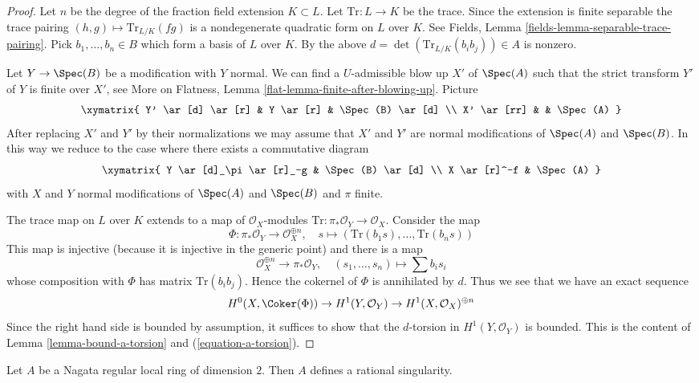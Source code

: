 \begin{proof}
Let $n$ be the degree of the fraction field extension $K \subset L$.
Let $\text{Tr} : L \to K$ be the trace. Since the extension is finite
separable the trace pairing $(h, g) \mapsto \text{Tr}_{L/K}(fg)$
is a nondegenerate quadratic form on $L$ over $K$. See
Fields, Lemma \ref{fields-lemma-separable-trace-pairing}.
Pick $b_1, \ldots, b_n \in B$ which form a basis of $L$ over $K$.
By the above $d = \det(\text{Tr}_{L/K}(b_ib_j)) \in A$ is nonzero.

\medskip\noindent
Let $Y \to \Spec(B)$ be a modification with $Y$ normal. We can find
a $U$-admissible blow up $X'$ of $\Spec(A)$ such that the strict transform
$Y'$ of $Y$ is finite over $X'$, see More on Flatness, Lemma
\ref{flat-lemma-finite-after-blowing-up}. Picture
$$
\xymatrix{
Y' \ar[d] \ar[r] & Y \ar[r] & \Spec(B) \ar[d] \\
X' \ar[rr] & & \Spec(A)
}
$$
After replacing $X'$ and $Y'$ by their normalizations we may assume that
$X'$ and $Y'$ are normal modifications of $\Spec(A)$ and $\Spec(B)$.
In this way we reduce to the case where there exists a commutative diagram
$$
\xymatrix{
Y \ar[d]_\pi \ar[r]_-g & \Spec(B) \ar[d] \\
X \ar[r]^-f & \Spec(A)
}
$$
with $X$ and $Y$ normal modifications of $\Spec(A)$ and $\Spec(B)$ and
$\pi$ finite.

\medskip\noindent
The trace map on $L$ over $K$ extends to a map of $\mathcal{O}_X$-modules
$\text{Tr} : \pi_*\mathcal{O}_Y \to \mathcal{O}_X$. Consider the map
$$
\Phi : \pi_*\mathcal{O}_Y \longrightarrow \mathcal{O}_X^{\oplus n},\quad
s \longmapsto (\text{Tr}(b_1s), \ldots, \text{Tr}(b_ns))
$$
This map is injective (because it is injective in the generic point)
and there is a map
$$
\mathcal{O}_X^{\oplus n} \longrightarrow \pi_*\mathcal{O}_Y,\quad
(s_1, \ldots, s_n) \longmapsto \sum b_i s_i
$$
whose composition with $\Phi$ has matrix $\text{Tr}(b_ib_j)$.
Hence the cokernel of $\Phi$ is annihilated by $d$. Thus we see that
we have an exact sequence
$$
H^0(X, \Coker(\Phi)) \to H^1(Y, \mathcal{O}_Y) \to
H^1(X, \mathcal{O}_X)^{\oplus n}
$$
Since the right hand side is bounded by assumption, it suffices to show
that the $d$-torsion in $H^1(Y, \mathcal{O}_Y)$ is bounded.
This is the content of Lemma \ref{lemma-bound-a-torsion} and
(\ref{equation-a-torsion}).
\end{proof}

\begin{lemma}
\label{lemma-regular-rational}
Let $A$ be a Nagata regular local ring of dimension $2$. Then $A$ defines
a rational singularity.
\end{lemma}

